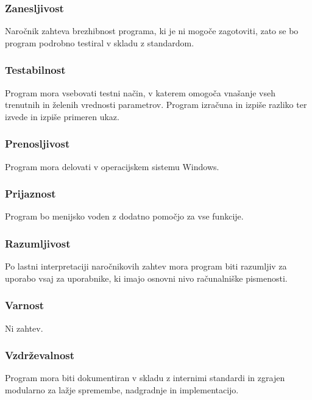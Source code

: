 \documentclass[a4paper,12pt]{article}
\begin{document}
			\subsubsection{Zanesljivost}

			\qquad Naročnik zahteva brezhibnost programa, ki je ni mogoče zagotoviti, zato se bo program 
			podrobno testiral v skladu z standardom.

			\subsubsection{Testabilnost}

			\qquad Program mora vsebovati testni način, v katerem omogoča vnašanje 
			vseh trenutnih in želenih vrednosti parametrov. Program izračuna in izpiše 
			razliko ter izvede in izpiše primeren ukaz.

			\subsubsection{Prenosljivost}

			\qquad Program mora delovati v operacijskem sistemu Windows.

			\subsubsection{Prijaznost}

			\qquad Program bo menijsko voden z dodatno pomočjo za vse funkcije.

			\subsubsection{Razumljivost}

			\qquad Po lastni interpretaciji naročnikovih zahtev mora program 
			biti razumljiv za uporabo vsaj za uporabnike, ki imajo osnovni nivo 
			računalniške pismenosti.

			\subsubsection{Varnost}

			\qquad Ni zahtev.

			\subsubsection{Vzdrževalnost}

			\qquad Program mora biti dokumentiran v skladu z internimi standardi 
			in zgrajen modularno za lažje spremembe, nadgradnje in implementacijo.
\end{document}
